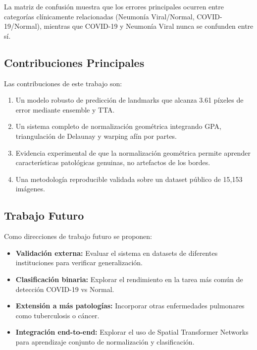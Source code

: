 \documentclass[runningheads]{llncs}
\begin{document}
La matriz de confusión muestra que los errores principales ocurren entre categorías clínicamente relacionadas (Neumonía Viral/Normal, COVID-19/Normal), mientras que COVID-19 y Neumonía Viral nunca se confunden entre sí.

\subsection{Contribuciones Principales}

Las contribuciones de este trabajo son:

\begin{enumerate}
    \item Un modelo robusto de predicción de landmarks que alcanza 3.61 píxeles de error mediante ensemble y TTA.

    \item Un sistema completo de normalización geométrica integrando GPA, triangulación de Delaunay y warping afín por partes.

    \item Evidencia experimental de que la normalización geométrica permite aprender características patológicas genuinas, no artefactos de los bordes.

    \item Una metodología reproducible validada sobre un dataset público de 15,153 imágenes.
\end{enumerate}

\subsection{Trabajo Futuro}

Como direcciones de trabajo futuro se proponen:

\begin{itemize}
    \item \textbf{Validación externa:} Evaluar el sistema en datasets de diferentes instituciones para verificar generalización.

    \item \textbf{Clasificación binaria:} Explorar el rendimiento en la tarea más común de detección COVID-19 vs Normal.

    \item \textbf{Extensión a más patologías:} Incorporar otras enfermedades pulmonares como tuberculosis o cáncer.

    \item \textbf{Integración end-to-end:} Explorar el uso de Spatial Transformer Networks para aprendizaje conjunto de normalización y clasificación.
\end{itemize}



\end{document}
